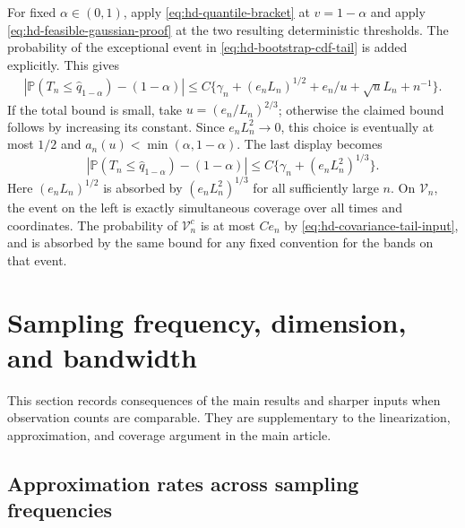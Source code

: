 \documentclass[12pt]{article}
\newcommand{\prob}{\mathbb{P}}
\numberwithin{equation}{section}
\begin{document}
For fixed $\alpha\in(0,1)$, apply \eqref{eq:hd-quantile-bracket} at
$v=1-\alpha$ and apply \eqref{eq:hd-feasible-gaussian-proof} at the
two resulting deterministic thresholds. The probability of the
exceptional event in \eqref{eq:hd-bootstrap-cdf-tail} is added explicitly.
This gives
\begin{align*}
 \left|\prob(T_n\le\widehat q_{1-\alpha})-(1-\alpha)\right|
 \le C\{\gamma_n+(e_nL_n)^{1/2}
                  +e_n/u+\sqrt uL_n+n^{-1}\}.
\end{align*}
If the total bound is small, take $u=(e_n/L_n)^{2/3}$; otherwise the
claimed bound follows by increasing its constant. Since
$e_nL_n^2\to0$, this choice is eventually at most $1/2$ and
$a_n(u)<\min(\alpha,1-\alpha)$. The last display becomes
\[
 \left|\prob(T_n\le\widehat q_{1-\alpha})-(1-\alpha)\right|
 \le C\{\gamma_n+(e_nL_n^2)^{1/3}\}.
\]
Here $(e_nL_n)^{1/2}$ is absorbed by $(e_nL_n^2)^{1/3}$ for all
sufficiently large $n$. On $\mathcal V_n$, the event on the left is
exactly simultaneous coverage over all times and coordinates. The
probability of $\mathcal V_n^c$ is at most $Ce_n$ by
\eqref{eq:hd-covariance-tail-input}, and is absorbed by the same bound
for any fixed convention for the bands on that event.

\section{Sampling frequency, dimension, and bandwidth}
\label{sec:sampling-density}\label{app:regime-proofs}

This section records consequences of the main results and sharper inputs
when observation counts are comparable. They are supplementary to the
linearization, approximation, and coverage argument in the main article.

\subsection{Approximation rates across sampling frequencies}
\label{sec:phase-transitions}\label{app:refined-sampling-bounds}
\end{document}
